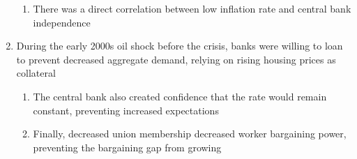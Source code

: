 \begin{enumerate}
\begin{enumerate}
\item There was a direct correlation between low inflation rate and central bank independence
\end{enumerate}
\item During the early 2000s oil shock before the crisis, banks were willing to loan to prevent decreased aggregate demand, relying on rising housing prices as collateral
\begin{enumerate}
\item The central bank also created confidence that the rate would remain constant, preventing increased expectations
\item Finally, decreased union membership decreased worker bargaining power, preventing the bargaining gap from growing
\end{enumerate}
\end{enumerate}
